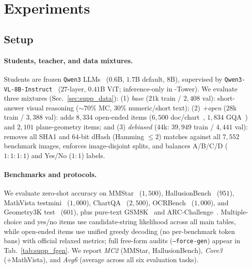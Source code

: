 \section{Experiments}
\label{sec:exp}

\subsection{Setup}
\label{sec:setup}

\paragraph{Students, teacher, and data mixtures.}
Students are frozen \texttt{Qwen3} LLMs~\citep{yang2025qwen3} ($0.6$B, $1.7$B
default, $8$B), supervised by \texttt{Qwen3-VL-8B-Instruct}~\citep{bai2025qwen3vl}
($27$-layer, $0.41$B ViT; inference-only in \modelname-Tower). We evaluate three
mixtures (Sec.~\ref{sec:supp_data}):
(1) \emph{base} ($21$k train / $2{,}408$ val): short-answer visual reasoning
(${\sim}70\%$ MC, $30\%$ numeric/short text);
(2) \emph{+open} ($28$k train / $3{,}388$ val): adds $8{,}334$ open-ended
items ($6{,}500$ doc/chart~\citep{mathew2021docvqa}, $1{,}834$
GQA~\citep{hudson2019gqa}) and $2{,}101$ plane-geometry items; and
(3) \emph{debiased} ($44$k: $39{,}949$ train / $4{,}441$ val): removes all
SHA1 and $64$-bit dHash (Hamming ${\le}2$) matches against all $7{,}552$
benchmark images, enforces image-disjoint splits, and balances A/B/C/D
($1{:}1{:}1{:}1$) and Yes/No ($1{:}1$) labels.

\paragraph{Benchmarks and protocols.}
We evaluate zero-shot accuracy on MMStar~\citep{chen2024mmstar} ($1{,}500$),
HallusionBench~\citep{guan2024hallusionbench} ($951$), MathVista
testmini~\citep{lu2024mathvista} ($1{,}000$), ChartQA~\citep{masry2022chartqa}
($2{,}500$), OCRBench~\citep{liu2023ocrbench} ($1{,}000$), and Geometry3K
test~\citep{lu2021geometry3k} ($601$), plus pure-text GSM8K~\citep{cobbe2021gsm8k}
and ARC-Challenge~\citep{clark2018arc}. Multiple-choice and yes/no items use
candidate-string likelihood across all main tables, while open-ended items use
unified greedy decoding (no per-benchmark token bans) with official relaxed
metrics; full free-form audits (\texttt{--force-gen}) appear in
Tab.~\ref{tab:supp_fgen}. We report \emph{MC2} (MMStar, HallusionBench),
\emph{Core3} (+MathVista), and \emph{Avg6} (average across all six evaluation tasks).

